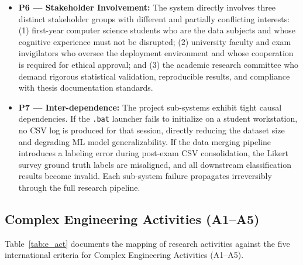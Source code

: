 \begin{itemize}
    \item \textbf{P6 — Stakeholder Involvement:} The system directly involves three distinct stakeholder groups with different and partially conflicting interests: (1) first-year computer science students who are the data subjects and whose cognitive experience must not be disrupted; (2) university faculty and exam invigilators who oversee the deployment environment and whose cooperation is required for ethical approval; and (3) the academic research committee who demand rigorous statistical validation, reproducible results, and compliance with thesis documentation standards.

    \item \textbf{P7 — Inter-dependence:} The project sub-systems exhibit tight causal dependencies. If the \texttt{.bat} launcher fails to initialize on a student workstation, no CSV log is produced for that session, directly reducing the dataset size and degrading ML model generalizability. If the data merging pipeline introduces a labeling error during post-exam CSV consolidation, the Likert survey ground truth labels are misaligned, and all downstream classification results become invalid. Each sub-system failure propagates irreversibly through the full research pipeline.
\end{itemize}

\subsection{Complex Engineering Activities (A1--A5)}
Table~\ref{tab:e_act} documents the mapping of research activities against the five international criteria for Complex Engineering Activities (A1--A5).

